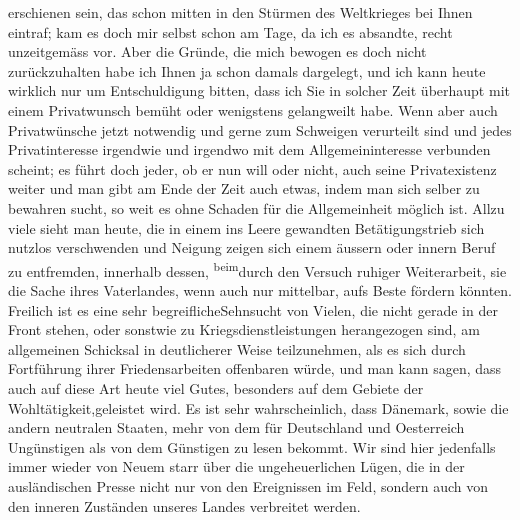 \begin{ledgroupsized}[t]{13cm}
               erschienen sein, das schon mitten in den Stürmen des Weltkrieges bei Ihnen eintraf;
               kam es doch mir selbst schon am Tage, da ich es absandte, recht unzeitgemäss vor.
               Aber die Gründe, die mich bewogen es doch nicht zurückzuhalten habe ich Ihnen ja  schon damals dargelegt\introOben{},\introOben{}
               und ich kann heute wirklich nur um Entschuldigung bitten, dass ich Sie in solcher
               Zeit überhaupt mit einem Privatwunsch bemüht oder wenigstens gelangweilt habe. Wenn
               aber auch Privatwünsche jetzt notwendig und gerne zum Schweigen verurteilt sind und
               jedes Privatinteresse irgendwie und irgendwo mit dem Allgemeininteresse verbunden
               scheint; es führt {\pb}doch jeder, ob er nun will oder
               nicht, auch seine Privatexistenz weiter und man gibt am Ende der Zeit auch etwas,
               indem man sich selber zu bewahren sucht, so weit es ohne Schaden für die
               Allgemeinheit möglich ist. Allzu viele sieht man heute, die in einem ins Leere
               gewandten Betätigungstrieb sich nutzlos verschwenden und Neigung zeigen sich einem
               äussern oder innern Beruf zu entfremden, innerhalb dessen, \substVorne{}\textsuperscript{beim}\substDazwischen{}durch den\substHinten{} Versuch ruhiger Weiterarbeit, sie die Sache ihres Vaterlandes, wenn auch nur
               mittelbar, aufs Beste fördern könnten. Freilich ist \introOben{}es eine sehr
                  begreifliche\introOben{}Sehnsucht von Vielen, die nicht gerade in der Front
               stehen, oder sonstwie zu Kriegsdienstleistungen herangezogen sind, am allgemeinen
               Schicksal in deutlicherer Weise teilzunehmen, als es sich durch Fortführung ihrer
               Friedensarbeiten offenbaren würde, und man kann sagen, dass auch auf diese Art heute
               viel Gutes, besonders auf dem Gebiete der Wohltätigkeit,geleistet wird.\pend
           \pstart
           Es ist sehr wahrscheinlich, dass {\pb}Dänemark, sowie die andern neutralen Staaten,
               mehr von dem für Deutschland und Oesterreich Ungünstigen als von dem Günstigen zu
               lesen bekommt. Wir sind hier jedenfalls immer wieder von Neuem starr über die
               ungeheuerlichen Lügen, die in der ausländischen Presse nicht nur von den Ereignissen
               im Feld, sondern auch von den inneren Zuständen unseres Landes verbreitet werden.

\end{ledgroupsized}
